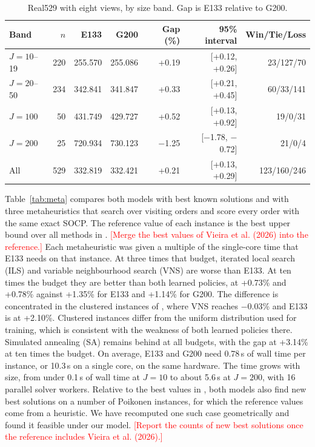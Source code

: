 \documentclass[preprint,12pt,authoryear]{elsarticle}
\newcommand{\placeholder}[1]{\textcolor{red}{[#1]}}
\begin{document}
\begin{table}[t]
\centering
\caption{Real529 with eight views, by size band. Gap is E133 relative to G200.}
\label{tab:real}
\small
\begin{tabular}{lrrrrrr}
\toprule
Band & $n$ & E133 & G200 & Gap (\%) & 95\% interval & Win/Tie/Loss \\
\midrule
$J = 10$--19 & 220 & 255.570 & 255.086 & +0.19 & [+0.12, +0.26] & 23/127/70 \\
$J = 20$--50 & 234 & 342.841 & 341.847 & +0.33 & [+0.21, +0.45] & 60/33/141 \\
$J = 100$ & 50 & 431.749 & 429.727 & +0.52 & [+0.13, +0.92] & 19/0/31 \\
$J = 200$ & 25 & 720.934 & 730.123 & $-$1.25 & [$-$1.78, $-$0.72] & 21/0/4 \\
All & 529 & 332.819 & 332.421 & +0.21 & [+0.13, +0.29] & 123/160/246 \\
\bottomrule
\end{tabular}
\end{table}

Table~\ref{tab:meta} compares both models with best known solutions and with three metaheuristics that search over visiting orders and score every order with the same exact SOCP. The reference value of each instance is the best upper bound over all methods in \citet{li2025}. \placeholder{Merge the best values of Vieira et al. (2026) into the reference.} Each metaheuristic was given a multiple of the single-core time that E133 needs on that instance. At three times that budget, iterated local search (ILS) and variable neighbourhood search (VNS) are worse than E133. At ten times the budget they are better than both learned policies, at +0.73\% and +0.78\% against +1.35\% for E133 and +1.14\% for G200. The difference is concentrated in the clustered instances of \citet{poikonen2020}, where VNS reaches $-$0.03\% and E133 is at +2.10\%. Clustered instances differ from the uniform distribution used for training, which is consistent with the weakness of both learned policies there. Simulated annealing (SA) remains behind at all budgets, with the gap at +3.14\% at ten times the budget. On average, E133 and G200 need 0.78\,s of wall time per instance, or 10.3\,s on a single core, on the same hardware. The time grows with size, from under 0.1\,s of wall time at $J = 10$ to about 5.6\,s at $J = 200$, with 16 parallel solver workers. Relative to the best values in \citet{li2025}, both models also find new best solutions on a number of Poikonen instances, for which the reference values come from a heuristic. We have recomputed one such case geometrically and found it feasible under our model. \placeholder{Report the counts of new best solutions once the reference includes Vieira et al. (2026).}
\end{document}
